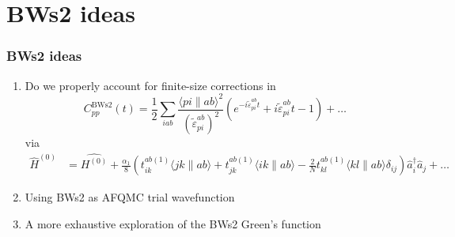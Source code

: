 \section{BWs2 ideas}
\begin{frame}
\frametitle{BWs2 ideas}
\begin{enumerate}
    \item Do we properly account for finite-size corrections in
  \begin{equation}
    C_{pp}^{\mathrm{BWs2}}(t) = 
    \frac{1}{2} \sum_{i a b}\frac{\langle p i \| a b\rangle^2 }{\left(\tilde{\varepsilon}_{p i}^{a b}\right)^2}
      \left(e^{-i \tilde{\varepsilon}_{p i}^{a b} t} + i \tilde{\varepsilon}_{p i}^{a b} t -1 \right) 
    + \ldots
  \end{equation}
via
\begin{align}
  \hat{H}^{(0)}&=\hat{H^{(0)}}+\frac{\alpha_1}{8}\left(t_{i k}^{a b(1)}\langle j k \| a b\rangle+t_{j k}^{a b(1)}\langle i k \| a b\rangle-\frac{2}{N} t_{k l}^{a b(1)}\langle k l \| a b\rangle \delta_{i j}\right) \hat{a}_i^{\dagger} \hat{a}_j + \ldots
\end{align}
\pause
\item Using BWs2 as AFQMC trial wavefunction
\pause
\item A more exhaustive exploration of the BWs2 Green's function
\end{enumerate}
\end{frame}
